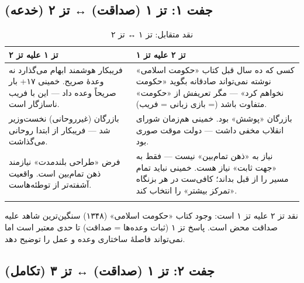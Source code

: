 \subsection{جفت ۱: تز ۱ (صداقت) ↔ تز ۲ (خدعه)}

\begin{longtable}{%
    >{\raggedleft\arraybackslash}p{}
    >{\raggedleft\arraybackslash}p{}}
\toprule
\rowcolor{cGreen!10}
\textbf{تز ۱ علیه تز ۲} &
\rowcolor{cAccent!8}
\textbf{تز ۲ علیه تز ۱} \\
\midrule

فریبکار هوشمند ابهام می‌گذارد نه وعدهٔ صریح. خمینی ۱۷+ بار صریحاً وعده داد — این با فریب ناسازگار است. &
کسی که ده سال قبل کتاب «حکومت اسلامی» نوشته نمی‌تواند صادقانه بگوید «حکومت نخواهم کرد» — مگر تعریفش از «حکومت» متفاوت باشد (= بازی زبانی = فریب). \\
\midrule

بازرگان (غیرروحانی) نخست‌وزیر شد — فریبکار از ابتدا روحانی می‌گذاشت. &
بازرگان «پوشش» بود. خمینی هم‌زمان شورای انقلاب مخفی داشت — دولت موقت صوری بود. \\
\midrule

فرض «طراحی بلندمدت» نیازمند ذهن تمام‌بین است. واقعیت آشفته‌تر از توطئه‌هاست. &
نیاز به «ذهن تمام‌بین» نیست — فقط به «جهت ثابت» نیاز هست. خمینی نباید تمام مسیر را از قبل بداند؛ کافی‌ست در هر بزنگاه «تمرکز بیشتر» را انتخاب کند. \\

\bottomrule
\caption{نقد متقابل: تز ۱ ↔ تز ۲}
\end{longtable}

\begin{noteBox}
نقد تز ۲ علیه تز ۱  است: وجود کتاب «حکومت اسلامی» (۱۳۴۸) سنگین‌ترین شاهد علیه صداقت محض است. پاسخ تز ۱ (ثبات وعده‌ها = صداقت) تا حدی معتبر است اما نمی‌تواند فاصلهٔ ساختاری وعده و عمل را توضیح دهد.
\end{noteBox}

\subsection{جفت ۲: تز ۱ (صداقت) ↔ تز ۳ (تکامل)}

